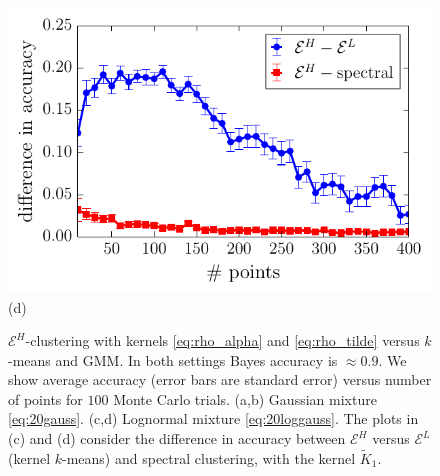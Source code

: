 \documentclass[aps,preprint,nofootinbib,floatfix]{revtex4-1}
\begin{document}
\begin{figure}
\begin{minipage}{0.49\textwidth}
\end{minipage}
\begin{minipage}{0.49\textwidth}
\centering
\includegraphics[width=1\textwidth]{lognormal_kernels_difference.pdf}\\[-1.0em]
(d)
\end{minipage}
\caption{
\label{fig:consist}
$\mathcal{E}^H$-clustering with kernels \eqref{eq:rho_alpha} and 
\eqref{eq:rho_tilde} versus
$k$-means and GMM. In both settings Bayes accuracy
is $\approx 0.9$. We show average accuracy (error bars are standard error)
versus number of points for $100$ Monte Carlo trials.
(a,b) Gaussian mixture \eqref{eq:20gauss}. 
(c,d) Lognormal mixture \eqref{eq:20loggauss}.
The plots in (c) and (d) consider the difference in accuracy
between $\mathcal{E}^H$ versus $\mathcal{E}^L$ (kernel $k$-means) and
spectral clustering, with the kernel $\widetilde{K}_1$.
}
\end{figure}
\end{document}
